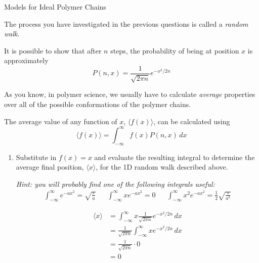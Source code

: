 \begin{activity}{Models for Ideal Polymer Chains}
\begin{ctqs}
\end{ctqs}

\begin{infobox}
	
	The process you have investigated in the previous questions is called a \emph{random walk}.
	
	It is possible to show that after $n$ steps, the probability of being at position $x$ is approximately
	\begin{equation*}
		P(n,x) = \frac{1}{\sqrt{2\pi n}}e^{-x^2/2n}
	\end{equation*}
	
\end{infobox}

\begin{ctqs}

	\question As you know, in polymer science, we usually have to calculate \emph{average} properties over all of the possible conformations of the polymer chains.
	
		The average value of any function of $x$, $\langle f(x)\rangle$, can be calculated using
		\begin{equation*}
			\langle f(x) \rangle = \int_{-\infty}^\infty f(x) P(n,x)\,dx
		\end{equation*}
		
		\begin{enumerate}
			\item Substitute in $f(x)=x$ and evaluate the resulting integral to determine the average final position, $\langle x \rangle$, for the 1D random walk described above.
			
				\emph{Hint: you will probably find one of the following integrals useful:}
				\begin{align*}
					\int_{-\infty}^\infty e^{-a x^2} = \sqrt{\frac{\pi}{a}} && \int_{-\infty}^\infty x e^{-a x^2} = 0 && \int_{-\infty}^\infty x^2 e^{-a x^2} = \frac{1}{2}\sqrt{\frac{\pi}{a^3}}
				\end{align*}
				
				\begin{solution}[1.5in]{}
					\begin{align*}
						\langle x \rangle &= \int_{-\infty}^\infty x \frac{1}{\sqrt{2\pi n}}e^{-x^2/2n}\, dx\\
						&= \frac{1}{\sqrt{2\pi n}} \int_{-\infty}^\infty x e^{-x^2/2n}\, dx\\
						&= \frac{1}{\sqrt{2\pi n}} \cdot 0\\
						&= 0
					\end{align*}
				\end{solution}
				

\end{enumerate}
\end{ctqs}
\end{activity}
